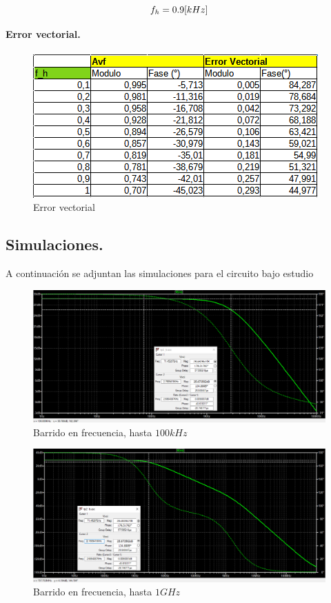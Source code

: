 \documentclass[11pt, a4paper]{article}
\begin{document}
\begin{equation}
    \centering
    \nonumber
    f_h = 0.9[kHz]
\end{equation}

\textbf{Error vectorial.} 
\paragraph{}
\begin{figure}[h!]
    \centering
    \includegraphics{Imagenes/tabla1.png}
    \caption{Error vectorial}
    \label{fig:enter-label}
\end{figure}
  
\subsection{Simulaciones.}
\onehalfspacing
A continuación se adjuntan las simulaciones para el circuito bajo estudio

\begin{figure}[h!]
    \centering
    \includegraphics[scale=0.4]{Imagenes/bode_barrido2_hasta100k.png}
    \caption{Barrido en frecuencia, hasta $100kHz$}
    \label{fig:enter-label}
\end{figure}

\begin{figure}[h!]
    \centering
    \includegraphics[scale=0.4]{Imagenes/bode_barrido2_hasta1G.png}
    \caption{Barrido en frecuencia, hasta $1GHz$}
    \label{fig:enter-label}
\end{figure}
\end{document}
